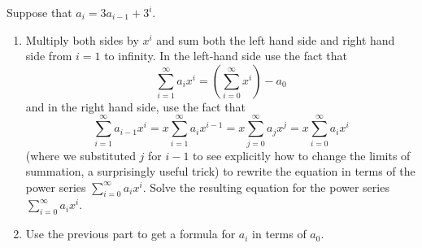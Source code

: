 \bp
\iteme Suppose that $a_i=3a_{i-1} + 3^i$.  \label{substituteandsolve}
\begin{enumerate}
\item Multiply both sides by $x^i$ and
sum both the left hand side and right hand side from $i=1$ to infinity. 
In the left-hand side use the fact that 
 $$\sum_{i=1}^\infty a_ix^i = (\sum_{i=0}^\infty x^i) -a_0$$ and in the
right hand side, use the fact that 
 $$\sum_{i=1}^\infty a_{i-1}x^i = x\sum_{i=1}^\infty a_ix^{i-1}
=x\sum_{j=0}^\infty a_jx^j =x\sum_{i=0}^\infty a_ix^i$$ (where we substituted
$j$ for $i-1$ to see explicitly how to change the limits of summation, a
surprisingly useful trick) to rewrite the equation in terms of the power series
$\sum_{i=0}^\infty a_ix^i$.  Solve the resulting equation for the power series
$\sum_{i=0}^\infty a_ix^i$.

\item Use the previous part to get a formula for $a_i$ in terms of $a_0$.


\end{enumerate}
